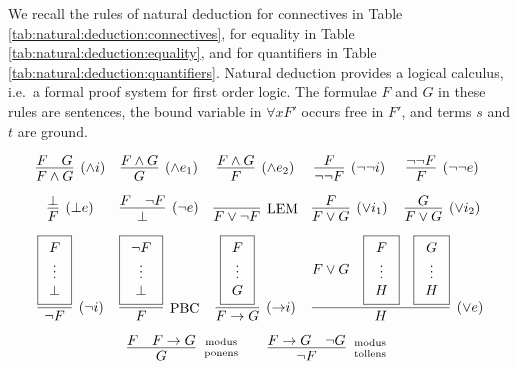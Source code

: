 
\begin{definition}\label{def:natural:deduction}
	We recall the rules of {\myem natural deduction} for connectives
	in Table \ref{tab:natural:deduction:connectives},
	for equality in Table \ref{tab:natural:deduction:equality},
	and for quantifiers in Table \ref{tab:natural:deduction:quantifiers}.
	Natural deduction provides a logical calculus,
	i.e.~a formal proof system for first order logic.
	The formulae $F$ and $G$ in these rules are sentences,
	the bound variable in  $\forall x F'$ occurs free in $F'$,
	and terms $s$ and $t$ are ground.

\begin{table}[hbt]
\begin{gather*}
\begin{array}{ccccc}
\infer[(\land i)]{F\land G}{F & G}
&
\infer[(\land e_1)]{G}{F \land G}
&
\infer[(\land e_2)]{F}{F \land G}
&
\infer[(\lnot\lnot i)]{\lnot\lnot F}{F}
&
\infer[(\lnot\lnot e)]{F}{\lnot\lnot F}
\\[0.7em]
\infer[(\bot e)]{F}{\bot}
&
\infer[(\lnot e)]{\bot}{F & \lnot F}
&
\infer[\text{LEM}]{F\lor\lnot F}{}
&
\infer[(\lor i_1)]{F\lor G}{F}
&
\infer[(\lor i_2)]{F\lor G}{G}
\\[0.7em]
\infer[(\lnot i)]{\lnot F}{
	\boxed{\begin{array}{c}F\\\vdots\\\bot\end{array}}}
&
\infer[\text{PBC}]{F}{
	\boxed{\begin{array}{c}\lnot F\\\vdots\\\bot\end{array}}}
&
\infer[({\limp} i)]{F\limp G}{
	\boxed{\begin{array}{c}F\\\vdots\\G\end{array}
}}
&
\multicolumn{2}{l}{
	\infer[(\lor e)]{H}{
		F\lor G &
		\boxed{\begin{array}{c}F\\\vdots\\H\end{array}} &
		\boxed{\begin{array}{c}G\\\vdots\\H\end{array}}
	}
}
\\[0.7em]
&
\multicolumn{3}{r}{
\infer[\text{modus}\atop\text{ponens}]{G}{F & F\limp G}
\qquad
\infer[\text{modus}\atop\text{tollens}]{\lnot F}{F\limp G & \lnot G}
}
&
\end{array}
\end{gather*}
\caption{Natural Deduction Rules for Connectives}
\label{tab:natural:deduction:connectives}
\end{table}


\end{definition}
